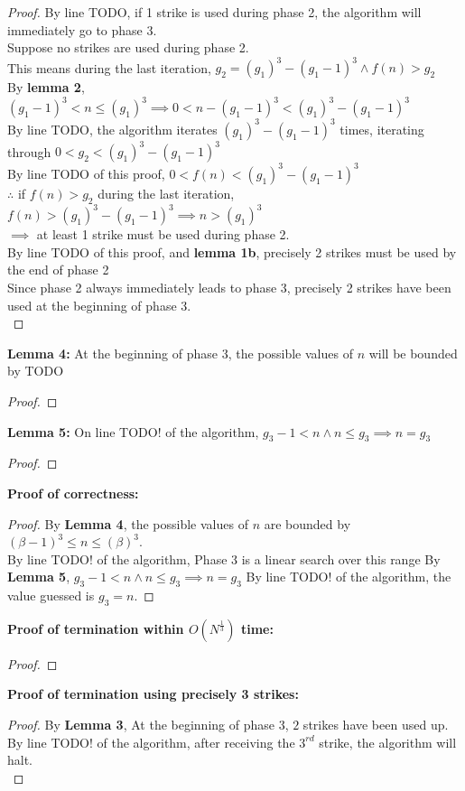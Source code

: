 \begin{problem}
  \begin{proof}
    By line TODO, if 1 strike is used during phase 2, the algorithm will immediately go to phase 3. \\
    Suppose no strikes are used during phase 2. \\
    This means during the last iteration, $g_2 = (g_1)^3 - (g_1 - 1)^3 \land f(n) > g_2$ \\
    By \textbf{lemma 2}, $(g_1 - 1)^3 < n \leq (g_1)^3 \implies 0 < n - (g_1 - 1)^3 < (g_1)^3 - (g_1 - 1)^3$ \\
    By line TODO, the algorithm iterates $(g_1)^3 - (g_1 - 1)^3$ times, iterating through $0 < g_2 < (g_1)^3 - (g_1 - 1)^3$ \\
    By line TODO of this proof, $0 < f(n) < (g_1)^3 - (g_1 - 1)^3$ \\
    $\therefore $ if $f(n) > g_2$ during the last iteration, $f(n) > (g_1)^3 - (g_1 - 1)^3 \implies n > (g_1)^3$ \\
    $\implies $ at least 1 strike must be used during phase 2. \\
    By line TODO of this proof, and \textbf{lemma 1b}, precisely 2 strikes must be used by the end of phase 2 \\
    Since phase 2 always immediately leads to phase 3, precisely 2 strikes have been used at the beginning of phase 3. \\
  \end{proof}
  \textbf{Lemma 4:} At the beginning of phase 3, the possible values of $n$ will be bounded by TODO
  \begin{proof}
  \end{proof}
  \textbf{Lemma 5:} On line TODO! of the algorithm, $g_3 - 1 < n \land n \leq g_3 \implies n = g_3$
  \begin{proof}
  \end{proof}
  \textbf{Proof of correctness:}
  \begin{proof}
  By \textbf{Lemma 4}, the possible values of $n$ are bounded by $(\beta - 1)^3 \leq n \leq (\beta)^3$. \\
  By line TODO! of the algorithm, Phase 3 is a linear search over this range
  By \textbf{Lemma 5}, $g_3 - 1 < n \land n \leq g_3 \implies n = g_3$
  By line TODO! of the algorithm, the value guessed is $g_3 = n$.
  \end{proof}
  \textbf{Proof of termination within $O(N^{\frac{1}{3}})$ time:}
  \begin{proof}
  \end{proof}
  \textbf{Proof of termination using precisely 3 strikes:}
  \begin{proof}
    By \textbf{Lemma 3}, At the beginning of phase 3, $2$ strikes have been used up. \\
    By line TODO! of the algorithm, after receiving the $3^{rd}$ strike, the algorithm will halt. \\
  \end{proof}
\end{problem}
